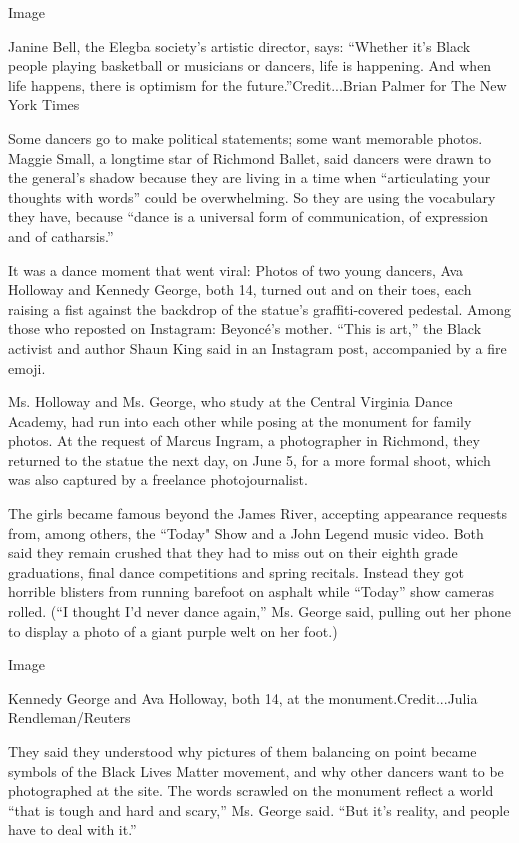 Image

Janine Bell, the Elegba society's artistic director, says: ``Whether
it's Black people playing basketball or musicians or dancers, life is
happening. And when life happens, there is optimism for the
future.''Credit...Brian Palmer for The New York Times

Some dancers go to make political statements; some want memorable
photos. Maggie Small, a longtime star of Richmond Ballet, said dancers
were drawn to the general's shadow because they are living in a time
when ``articulating your thoughts with words'' could be overwhelming. So
they are using the vocabulary they have, because ``dance is a universal
form of communication, of expression and of catharsis.''

It was a dance moment that went viral: Photos of two young dancers, Ava
Holloway and Kennedy George, both 14, turned out and on their toes, each
raising a fist against the backdrop of the statue's graffiti-covered
pedestal. Among those who reposted on Instagram: Beyoncé's mother.
``This is art,'' the Black activist and author Shaun King said in an
Instagram post, accompanied by a fire emoji.

Ms. Holloway and Ms. George, who study at the Central Virginia Dance
Academy, had run into each other while posing at the monument for family
photos. At the request of Marcus Ingram, a photographer in Richmond,
they returned to the statue the next day, on June 5, for a more formal
shoot, which was also captured by a freelance photojournalist.

The girls became famous beyond the James River, accepting appearance
requests from, among others, the ``Today" Show and a John Legend music
video. Both said they remain crushed that they had to miss out on their
eighth grade graduations, final dance competitions and spring recitals.
Instead they got horrible blisters from running barefoot on asphalt
while ``Today'' show cameras rolled. (``I thought I'd never dance
again,'' Ms. George said, pulling out her phone to display a photo of a
giant purple welt on her foot.)

Image

Kennedy George and Ava Holloway, both 14, at the monument.Credit...Julia
Rendleman/Reuters

They said they understood why pictures of them balancing on point became
symbols of the Black Lives Matter movement, and why other dancers want
to be photographed at the site. The words scrawled on the monument
reflect a world ``that is tough and hard and scary,'' Ms. George said.
``But it's reality, and people have to deal with it.''

